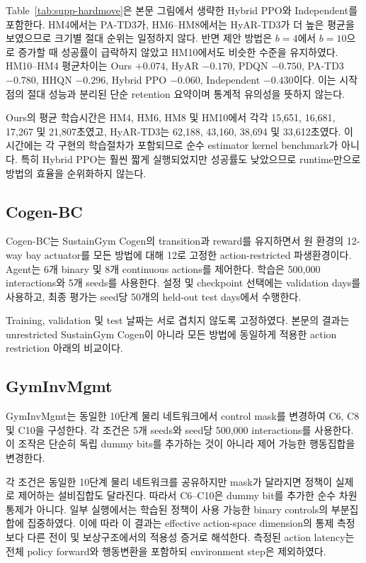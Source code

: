 \documentclass[10pt,journal]{IEEEtran}
\begin{document}
Table~\ref{tab:supp-hardmove}은 본문 그림에서 생략한 Hybrid PPO와 Independent를 포함한다. HM4에서는 PA-TD3가, HM6--HM8에서는 HyAR-TD3가 더 높은 평균을 보였으므로 크기별 절대 순위는 일정하지 않다. 반면 제안 방법은 $b=4$에서 $b=10$으로 증가할 때 성공률이 급락하지 않았고 HM10에서도 비슷한 수준을 유지하였다. HM10--HM4 평균차이는 Ours $+0.074$, HyAR $-0.170$, PDQN $-0.750$, PA-TD3 $-0.780$, HHQN $-0.296$, Hybrid PPO $-0.060$, Independent $-0.430$이다. 이는 시작점의 절대 성능과 분리된 단순 retention 요약이며 통계적 유의성을 뜻하지 않는다.

Ours의 평균 학습시간은 HM4, HM6, HM8 및 HM10에서 각각 15,651, 16,681, 17,267 및 21,807초였고, HyAR-TD3는 62,188, 43,160, 38,694 및 33,612초였다. 이 시간에는 각 구현의 학습절차가 포함되므로 순수 estimator kernel benchmark가 아니다. 특히 Hybrid PPO는 훨씬 짧게 실행되었지만 성공률도 낮았으므로 runtime만으로 방법의 효율을 순위화하지 않는다.

\subsection{Cogen-BC}

Cogen-BC는 SustainGym Cogen의 transition과 reward를 유지하면서 원 환경의 12-way bay actuator를 모든 방법에 대해 12로 고정한 action-restricted 파생환경이다. Agent는 6개 binary 및 8개 continuous actions를 제어한다. 학습은 500,000 interactions와 5개 seeds를 사용한다. 설정 및 checkpoint 선택에는 validation days를 사용하고, 최종 평가는 seed당 50개의 held-out test days에서 수행한다.

Training, validation 및 test 날짜는 서로 겹치지 않도록 고정하였다. 본문의 결과는 unrestricted SustainGym Cogen이 아니라 모든 방법에 동일하게 적용한 action restriction 아래의 비교이다.

\subsection{GymInvMgmt}

GymInvMgmt는 동일한 10단계 물리 네트워크에서 control mask를 변경하여 C6, C8 및 C10을 구성한다. 각 조건은 5개 seeds와 seed당 500,000 interactions를 사용한다. 이 조작은 단순히 독립 dummy bits를 추가하는 것이 아니라 제어 가능한 행동집합을 변경한다.

각 조건은 동일한 10단계 물리 네트워크를 공유하지만 mask가 달라지면 정책이 실제로 제어하는 설비집합도 달라진다. 따라서 C6--C10은 dummy bit를 추가한 순수 차원 통제가 아니다. 일부 실행에서는 학습된 정책이 사용 가능한 binary controls의 부분집합에 집중하였다. 이에 따라 이 결과는 effective action-space dimension의 통제 측정보다 다른 전이 및 보상구조에서의 적용성 증거로 해석한다. 측정된 action latency는 전체 policy forward와 행동변환을 포함하되 environment step은 제외하였다.
\end{document}
